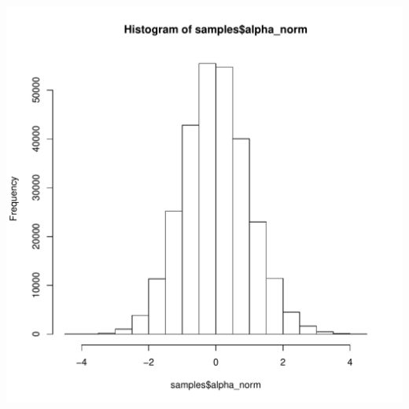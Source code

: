 \documentclass{article}\usepackage[]{graphicx}\usepackage[]{color}
\newenvironment{knitrout}{}{} %
\begin{document}
\begin{knitrout}
\includegraphics[width=5.5in]{figure/p3bHist-3} 

\end{knitrout}
\end{document}
